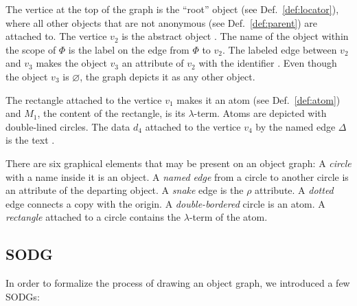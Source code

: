 The vertice at the top of the graph is the ``root'' object (see Def.~\ref{def:locator}),
where all other objects that are not anonymous (see Def.~\ref{def:parent}) are attached to.
The vertice \(v_2\) is the abstract object . The name of the object within the
scope of \(\Phi\) is the label on the edge from \(\Phi\) to \(v_2\). The labeled edge
between \(v_2\) and \(v_3\) makes the object \(v_3\) an attribute of \(v_2\) with the
identifier . Even though the object \(v_3\) is \(\varnothing\), the graph
depicts it as any other object.

The rectangle attached to the vertice \(v_1\) makes it an atom (see Def.~\ref{def:atom})
and \(M_1\), the content of the rectangle, is its \(\lambda\)-term. Atoms
are depicted with double-lined circles. The data \(d_4\)
attached to the vertice \(v_4\) by the named edge \(\Delta\)
is the text .

There are six graphical elements that may be present on an object graph:
A \emph{circle} with a name inside it is an object.
A \emph{named edge} from a circle to another circle is an attribute of the departing object.
A \emph{snake} edge is the \(\rho\) attribute.
A \emph{dotted} edge connects a copy with the origin.
A \emph{double-bordered} circle is an atom.
A \emph{rectangle} attached to a circle contains the \(\lambda\)-term of the atom.

\subsection{SODG}

In order to formalize the process of drawing an object graph,
we introduced a few SODGs:

